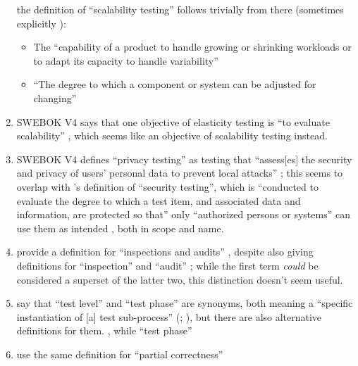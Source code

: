 \begin{enumerate}
            the definition of ``scalability testing'' follows trivially from there
            (sometimes explicitly ):
            \begin{itemize}
                  \item The ``capability of a product to handle growing or
                        shrinking workloads or to adapt its capacity to handle
                        variability'' \citep{ISO_IEC2023a}
                  \item ``The degree to which a component or system can be
                        adjusted for changing'' 
            \end{itemize}
      \item SWEBOK V4 says that one objective of elasticity testing is ``to
            evaluate scalability'' \citep[p.~5-9]{SWEBOK2024}, which seems like
            an objective of scalability testing instead.
      \item SWEBOK V4 defines ``privacy testing'' as testing that ``assess[es]
            the security and privacy of users' personal data to prevent local
            attacks'' \citep[p.~5-10]{SWEBOK2024}; this seems to overlap with
            \citeauthor{IEEE2022}'s definition of ``security testing'', which is
            ``conducted to evaluate the degree to which a test item, and
            associated data and information, are protected so that'' only
            ``authorized persons or systems'' can use them as intended
            \citeyearpar{IEEE2022}, both in scope and name.
      \item \citeauthor*{IEEE2017} provide a definition for ``inspections and
            audits'' \citeyearpar[p.~228]{IEEE2017}, despite also giving
            definitions for ``inspection'' \citeyearpar[p.~227]{IEEE2017} and
            ``audit'' \citeyearpar[p.~36]{IEEE2017}; while the first term
            \emph{could} be considered a superset of the latter two, this
            distinction doesn't seem useful.
      \item \citeauthor*{IEEE2017} say that ``test level'' and ``test phase''
            are synonyms, both meaning a ``specific instantiation of [a] test
            sub-process'' (\citeyear[pp.~469,~470]{IEEE2017};
            \citeyear[p.~9]{IEEE2013}), but there are also alternative
            definitions for them. \procLevel{\citeyearpar}, while
            ``test phase'' \phaseDef{}
      \item \citet{IEEE2017} use the same definition for ``partial correctness''

\end{enumerate}
